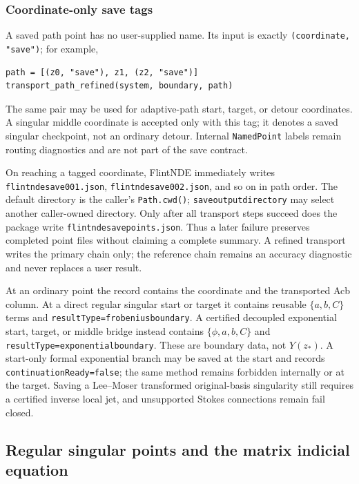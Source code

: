 \documentclass[11pt]{article}
\renewcommand{\_}{\origunderscore\allowbreak}
\begin{document}
\subsubsection{Coordinate-only save tags}

A saved path point has no user-supplied name.  Its input is exactly
\texttt{(coordinate, "save")}; for example,
\begin{verbatim}
path = [(z0, "save"), z1, (z2, "save")]
transport_path_refined(system, boundary, path)
\end{verbatim}
The same pair may be used for adaptive-path start, target, or detour coordinates.  A singular
middle coordinate is accepted only with this tag; it denotes a saved singular checkpoint,
not an ordinary detour.  Internal \texttt{NamedPoint} labels remain routing diagnostics and
are not part of the save contract.

On reaching a tagged coordinate, FlintNDE immediately writes
\texttt{flintnde\_save\_001.json}, \texttt{flintnde\_save\_002.json}, and so on in path
order.  The default directory is the caller's \texttt{Path.cwd()};
\texttt{save\_output\_directory} may select another caller-owned directory.  Only after all
transport steps succeed does the package write \texttt{flintnde\_save\_points.json}.  Thus a
later failure preserves completed point files without claiming a complete summary.  A
refined transport writes the primary chain only; the reference chain remains an accuracy
diagnostic and never replaces a user result.

At an ordinary point the record contains the coordinate and the transported Acb column.  At
a direct regular singular start or target it contains reusable $\{a,b,C\}$ terms and
\texttt{resultType=frobenius\_boundary}.  A certified decoupled exponential start, target, or
middle bridge instead contains $\{\phi,a,b,C\}$ and
\texttt{resultType=exponential\_boundary}.  These are boundary data, not $Y(z_*)$.
A start-only formal exponential branch may be saved at the start and records
\texttt{continuationReady=false}; the same method remains forbidden internally or at the
target.  Saving a Lee--Moser transformed original-basis singularity still requires a
certified inverse local jet, and unsupported Stokes connections remain fail closed.

\subsection{Regular singular points and the matrix indicial equation}
\label{subsec:frobenius}
\end{document}
